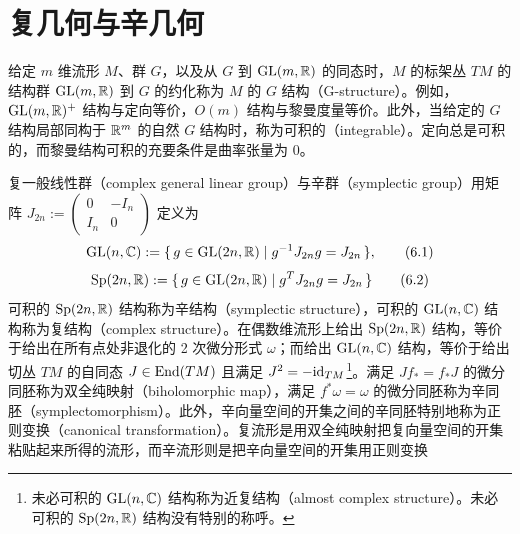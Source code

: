 
\section{复几何与辛几何}

给定 $m$ 维流形 $M$、群 $G$，以及从 $G$ 到 $\mathrm{GL}(m,\mathbb{R})$ 的同态时，$M$ 的标架丛 $TM$ 的结构群 $\mathrm{GL}(m,\mathbb{R})$ 到 $G$ 的约化称为 $M$ 的 $G$ 结构（G-structure）。例如，$\mathrm{GL}(m,\mathbb{R})^{+}$ 结构与定向等价，$O(m)$ 结构与黎曼度量等价。此外，当给定的 $G$ 结构局部同构于 $\mathbb{R}^m$ 的自然 $G$ 结构时，称为可积的（integrable）。定向总是可积的，而黎曼结构可积的充要条件是曲率张量为 $0$。

复一般线性群（complex general linear group）与辛群（symplectic group）用矩阵 $J_{2n}:=\begin{pmatrix}0 & -I_n\\ I_n & 0\end{pmatrix}$ 定义为
\begin{equation}
  \mathrm{GL}(n,\mathbb{C}) := \{\, g\in\mathrm{GL}(2n,\mathbb{R}) \mid g^{-1}J_{2n}g = J_{2n} \,\}, \tag{6.1}
\end{equation}
\begin{equation}
  \mathrm{Sp}(2n,\mathbb{R}) := \{\, g\in\mathrm{GL}(2n,\mathbb{R}) \mid g^{T}J_{2n}g = J_{2n} \,\} \tag{6.2}
\end{equation}
可积的 $\mathrm{Sp}(2n,\mathbb{R})$ 结构称为辛结构（symplectic structure），可积的 $\mathrm{GL}(n,\mathbb{C})$ 结构称为复结构（complex structure）。在偶数维流形上给出 $\mathrm{Sp}(2n,\mathbb{R})$ 结构，等价于给出在所有点处非退化的 2 次微分形式 $\omega$；而给出 $\mathrm{GL}(n,\mathbb{C})$ 结构，等价于给出切丛 $TM$ 的自同态 $J\in\operatorname{End}(TM)$ 且满足 $J^2=-\mathrm{id}_{TM}$\footnote{未必可积的 $\mathrm{GL}(n,\mathbb{C})$ 结构称为近复结构（almost complex structure）。未必可积的 $\mathrm{Sp}(2n,\mathbb{R})$ 结构没有特别的称呼。}。满足 $Jf_{*}=f_{*}J$ 的微分同胚称为双全纯映射（biholomorphic map），满足 $f^{*}\omega=\omega$ 的微分同胚称为辛同胚（symplectomorphism）。此外，辛向量空间的开集之间的辛同胚特别地称为正则变换（canonical transformation）。复流形是用双全纯映射把复向量空间的开集粘贴起来所得的流形，而辛流形则是把辛向量空间的开集用正则变换

